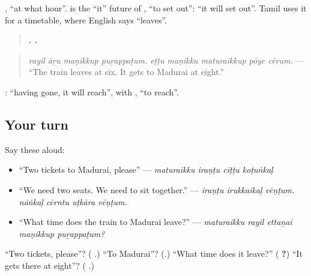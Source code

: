 \textbf{ }, \textquotedblleft{}at what hour\textquotedblright{}. \textbf{} is the \textquotedblleft{}it\textquotedblright{} future of \textbf{}, \textquotedblleft{}to set out\textquotedblright{}: \textquotedblleft{}it will set out\textquotedblright{}. Tamil uses it for a timetable, where English says \textquotedblleft{}leaves\textquotedblright{}.

\begin{quote}
\textbf{   .     .}
\end{quote}

\begin{quote}
\emph{rayil āṟu maṇikkup puṟappaṭum. eṭṭu maṇikku maturaikkup pōyc cērum.} — \textquotedblleft{}The train leaves at six. It gets to Madurai at eight.\textquotedblright{}
\end{quote}

\textbf{ }: \textquotedblleft{}having gone, it will reach\textquotedblright{}, with \textbf{}, \textquotedblleft{}to reach\textquotedblright{}.

\subsection*{Your turn}
Say these aloud:

\begin{itemize}
\raggedright
  \item \textquotedblleft{}Two tickets to Madurai, please\textquotedblright{} — \emph{maturaikku iraṇṭu cīṭṭu koṭuṅkaḷ}
  \item \textquotedblleft{}We need two seats. We need to sit together.\textquotedblright{} — \emph{iraṇṭu irukkaikaḷ vēṇṭum. nāṅkaḷ cērntu uṭkāra vēṇṭum.}
  \item \textquotedblleft{}What time does the train to Madurai leave?\textquotedblright{} — \emph{maturaikku rayil ettaṉai maṇikkup puṟappaṭum?}
\end{itemize}

\begin{tcolorbox}[breakable,colback=teal!4,colframe=teal!35!black,title={Before you move on}]
\textquotedblleft{}Two tickets, please\textquotedblright{}? (\textbf{  }.) \textquotedblleft{}To Madurai\textquotedblright{}? (\textbf{}.) \textquotedblleft{}What time does it leave?\textquotedblright{} (\textbf{  ?}) \textquotedblleft{}It gets there at eight\textquotedblright{}? (\textbf{   }.)
\end{tcolorbox}
